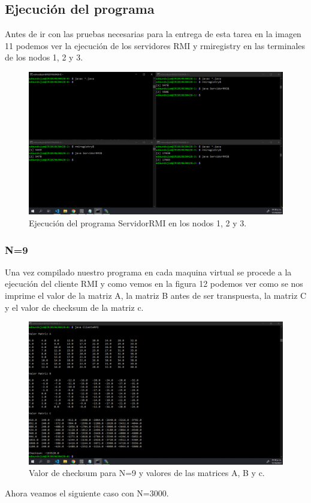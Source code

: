\documentclass[11pt]{article}
\begin{document}
		\subsection{Ejecución del programa}
		Antes de ir con las pruebas necesarias para la entrega de esta tarea en la imagen 11 podemos ver la ejecución de los servidores RMI y rmiregistry en las terminales de los nodos 1, 2 y 3.
		\begin{figure}[H]
			\centering
			\includegraphics[scale=0.34]{resources/servidores.png}
			\caption{Ejecución del programa ServidorRMI en los nodos 1, 2 y 3. }\label{fig:picture}
		\end{figure}
		\subsubsection{N=9}
		Una vez compilado nuestro programa en cada maquina virtual se procede a la ejecución del cliente RMI y como vemos en la figura 12 podemos ver como se nos imprime el valor de la matriz A, la matriz B antes de ser transpuesta, la matriz C y el valor de checksum de la matriz c.
		\begin{figure}[H]
			\centering
			\includegraphics[scale=0.34]{resources/hacksuwul.png}
			\caption{Valor de checksum para N=9 y valores de las matrices A, B y c. }\label{fig:picture}
		\end{figure}
		Ahora veamos el siguiente caso con N=3000.
\end{document}
